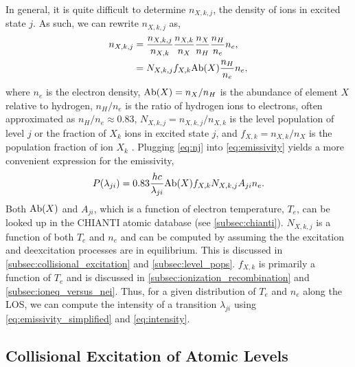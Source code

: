 In general, it is quite difficult to determine $n_{X,k,j}$, the density of ions in excited state $j$. As such, we can rewrite $n_{X,k,j}$ as,
\begin{align}\label{eq:nj}
    n_{X,k,j} &= \frac{n_{X,k,j}}{n_{X,k}}\frac{n_{X,k}}{n_X}\frac{n_X}{n_H}\frac{n_H}{n_e}n_e, \nonumber\\
              &= N_{X,k,j}f_{X,k}\textup{Ab}(X)\frac{n_H}{n_e}n_e,
\end{align}
where $n_e$ is the electron density, $\textup{Ab}(X)=n_X/n_H$ is the abundance of element $X$ relative to hydrogen, $n_H/n_e$ is the ratio of hydrogen ions to electrons, often approximated as $n_H/n_e\approx0.83$, $N_{X,k,j}=n_{X,k,j}/n_{X,k}$ is the level population of level $j$ or the fraction of $X_k$ ions in excited state $j$, and $f_{X,k}=n_{X,k}/n_X$ is the population fraction of ion $X_k$ \citep{del_zanna_solar_2018}. Plugging \autoref{eq:nj} into \autoref{eq:emissivity} yields a more convenient expression for the emissivity,
\begin{equation}\label{eq:emissivity_simplified}
    P(\lambda_{ji}) = 0.83\frac{hc}{\lambda_{ji}}\textup{Ab}(X)f_{X,k}N_{X,k,j}A_{ji}n_e.
\end{equation}
Both $\textup{Ab}(X)$ and $A_{ji}$, which is a function of electron temperature, $T_e$, can be looked up in the CHIANTI atomic database (see \autoref{subsec:chianti}). $N_{X,k,j}$ is a function of both $T_e$ and $n_e$ and can be computed by assuming the the excitation and deexcitation processes are in equilibrium. This is discussed in \autoref{subsec:collisional_excitation} and \autoref{subsec:level_pops}. $f_{X,k}$ is primarily a function of $T_e$ and is discussed in \autoref{subsec:ionization_recombination} and \autoref{subsec:ioneq_versus_nei}. Thus, for a given distribution of $T_e$ and $n_e$ along the LOS, we can compute the intensity of a transition $\lambda_{ji}$ using \autoref{eq:emissivity_simplified} and \autoref{eq:intensity}.

\subsection{Collisional Excitation of Atomic Levels}\label{subsec:collisional_excitation}

